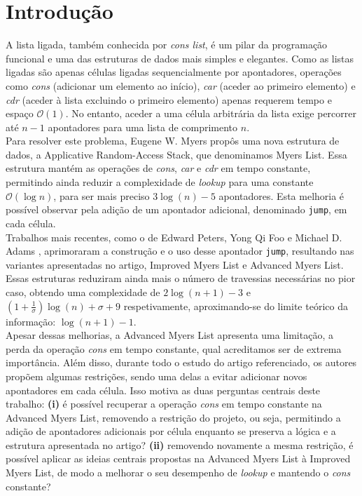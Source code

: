 \section{Introdução}

A lista ligada, também conhecida por \textit{cons list}, é um pilar da programação funcional e uma das estruturas de 
dados mais simples e elegantes. Como as listas ligadas são apenas células ligadas sequencialmente por apontadores, 
operações como \textit{cons} (adicionar um elemento ao início), \textit{car} (aceder ao primeiro elemento)
e \textit{cdr} (aceder à lista excluindo o primeiro elemento) apenas requerem tempo e espaço $\mathcal{O}(1)$. No entanto, aceder 
a uma célula arbitrária da lista exige percorrer até $n - 1$ apontadores para uma lista de comprimento $n$.
\\

Para resolver este problema, Eugene W. Myers \cite{myers1983} propôs uma nova estrutura de dados,
a Applicative Random-Access Stack, que denominamos Myers List. 
Essa estrutura mantém as operações de \textit{cons}, \textit{car} e \textit{cdr} em tempo constante, permitindo ainda reduzir a complexidade 
de \textit{lookup} para uma constante $\mathcal{O}(\log n)$, para ser mais preciso $3 \log(n) - 5$ apontadores. Esta melhoria é possível
observar pela adição de um apontador adicional, denominado \texttt{jump}, em cada célula.
\\

Trabalhos mais recentes, como o de Edward Peters, Yong Qi Foo e Michael D. Adams \cite{peters2025}, 
aprimoraram a construção e o uso desse apontador \texttt{jump}, resultando nas variantes 
apresentadas no artigo, Improved Myers List e Advanced Myers List. Essas estruturas reduziram ainda mais o número de travessias
necessárias no pior caso, obtendo uma complexidade de $2 \log(n + 1) - 3$ e $(1 + \frac{1}{\sigma}) \log(n) + \sigma + 9$ respetivamente, 
aproximando-se do limite teórico da informação: $\log(n + 1) - 1$.
\\

Apesar dessas melhorias, a Advanced Myers List apresenta uma limitação, a perda da operação \textit{cons} em tempo constante, 
qual acreditamos ser de extrema importância. Além disso, durante todo o estudo do artigo referenciado, os autores 
propõem algumas restrições, sendo uma delas a evitar adicionar novos apontadores em cada célula. Isso motiva as duas perguntas 
centrais deste trabalho: \textbf{(i)} é possível recuperar a operação \textit{cons} em tempo constante na Advanced Myers List, removendo 
a restrição do projeto, ou seja, permitindo a adição de apontadores adicionais por célula enquanto se preserva a lógica e a estrutura 
apresentada no artigo? \textbf{(ii)} removendo novamente a mesma restrição, é possível aplicar as ideias centrais propostas na 
Advanced Myers List à Improved Myers List, de modo a melhorar o seu desempenho de \textit{lookup} e mantendo o \textit{cons} constante?
\\

